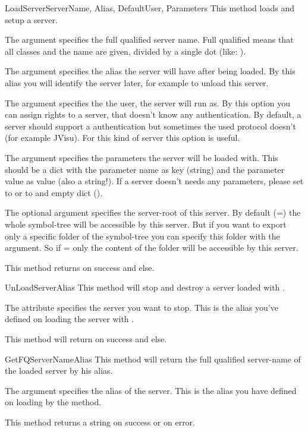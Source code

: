\begin{methoddesc}[System]{LoadServer}{ServerName, Alias, DefaultUser, Parameters}
This method loads and setup a server. 

The argument  specifies the full qualified server name. Full 
qualified means that all classes and the name are given, divided by a single 
dot (like: ).

The argument  specifies the alias the server will have after 
being loaded. By this alias you will identify the server later, for example 
to unload this server.

The argument  specifies the the user, the server will run as. 
By this option you can assign rights to a server, that doesn't know any 
authentication. By default, a server should support a authentication but 
sometimes the used protocol doesn't (for example JVisu). For this kind of 
server this option is useful.

The argument  specifies the parameters the server will be 
loaded with. This should be a dict with the parameter name as key (string)
and the parameter value as value (also a string!). If a server doesn't needs
any parameters, please set  to  or to and empty 
dict (\code{\{\}}). 

The optional argument  specifies the server-root of this server. 
By default (=) the whole symbol-tree will be accessible
by this server. But if you want to export only a specific folder of the 
symbol-tree you can specify this folder with the  argument. So
if = only the content of the folder 
will be accessible by this server.

This method returns  on success and  else.
\end{methoddesc}


\begin{methoddesc}[System]{UnLoadServer}{Alias}
This method will stop and destroy a server loaded with .

The attribute  specifies the server you want to stop. This is the 
alias you've defined on loading the server with .

This method will return  on success and  else.
\end{methoddesc}


\begin{methoddesc}[System]{GetFQServerName}{Alias}
This method will return the full qualified server-name of the loaded server
by his alias. 

The argument  specifies the alias of the server. This is the alias
you have defined on loading by the  method.

This method returns a string on success or  on error.
\end{methoddesc}


